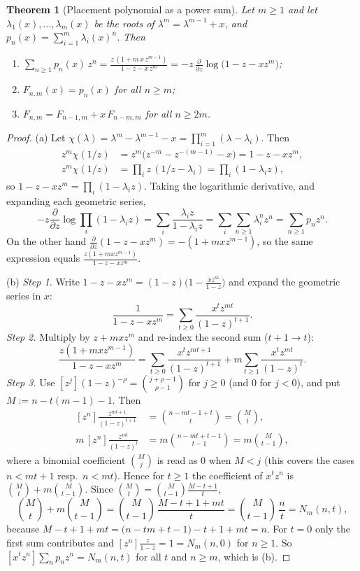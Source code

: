 \documentclass[11pt,a4paper]{article}
\newtheorem{theorem}{Theorem}[section]
\theoremstyle{definition}
\theoremstyle{remark}
\begin{document}
\begin{theorem}[Placement polynomial as a power sum]\label{thm:gf}
Let $m\ge1$ and let $\lambda_1(x),\dots,\lambda_m(x)$ be the roots of $\lambda^m=\lambda^{m-1}+x$, and $p_n(x)=\sum_{i=1}^m\lambda_i(x)^n$. Then
\begin{enumerate}[label=(\alph*),nosep]
\item $\displaystyle\sum_{n\ge1}p_n(x)\,z^n=\frac{z\,(1+m\,x\,z^{m-1})}{1-z-x\,z^m}=-z\,\frac{\partial}{\partial z}\log\big(1-z-xz^m\big)$;
\item $F_{n,m}(x)=p_n(x)$ for all $n\ge m$;
\item $F_{n,m}=F_{n-1,m}+x\,F_{n-m,m}$ for all $n\ge2m$.
\end{enumerate}
\end{theorem}
\begin{proof}
(a) Let $\chi(\lambda)=\lambda^m-\lambda^{m-1}-x=\prod_{i=1}^m(\lambda-\lambda_i)$. Then
\[
\begin{aligned}
z^m\chi(1/z)&=z^m\big(z^{-m}-z^{-(m-1)}-x\big)=1-z-xz^m,\\
z^m\chi(1/z)&=\prod_i z\,(1/z-\lambda_i)=\prod_i(1-\lambda_iz),
\end{aligned}
\]
so $1-z-xz^m=\prod_i(1-\lambda_iz)$. Taking the logarithmic derivative, and expanding each geometric series,
\[
-z\frac{\partial}{\partial z}\log\prod_i(1-\lambda_iz)=\sum_i\frac{\lambda_iz}{1-\lambda_iz}=\sum_i\sum_{n\ge1}\lambda_i^nz^n=\sum_{n\ge1}p_nz^n .
\]
On the other hand $\frac{\partial}{\partial z}(1-z-xz^m)=-(1+mxz^{m-1})$, so the same expression equals $\frac{z(1+mxz^{m-1})}{1-z-xz^m}$.

(b) \emph{Step 1.} Write $1-z-xz^m=(1-z)\big(1-\tfrac{xz^m}{1-z}\big)$ and expand the geometric series in $x$:
\[
\frac1{1-z-xz^m}=\sum_{t\ge0}\frac{x^tz^{mt}}{(1-z)^{t+1}}.
\]
\emph{Step 2.} Multiply by $z+mxz^m$ and re-index the second sum ($t+1\to t$):
\[
\frac{z(1+mxz^{m-1})}{1-z-xz^m}=\sum_{t\ge0}\frac{x^tz^{mt+1}}{(1-z)^{t+1}}+m\sum_{t\ge1}\frac{x^tz^{mt}}{(1-z)^{t}} .
\]
\emph{Step 3.} Use $[z^j](1-z)^{-\rho}=\binom{j+\rho-1}{\rho-1}$ for $j\ge0$ (and $0$ for $j<0$), and put $M:=n-t(m-1)-1$. Then
\[
\begin{aligned}
[z^n]\frac{z^{mt+1}}{(1-z)^{t+1}}&=\binom{n-mt-1+t}{t}=\binom Mt,\\
m\,[z^n]\frac{z^{mt}}{(1-z)^{t}}&=m\binom{n-mt+t-1}{t-1}=m\binom M{t-1},
\end{aligned}
\]
where a binomial coefficient $\binom Mj$ is read as $0$ when $M<j$ (this covers the cases $n<mt+1$ resp.\ $n<mt$). Hence for $t\ge1$ the coefficient of $x^tz^n$ is $\binom Mt+m\binom M{t-1}$. Since $\binom Mt=\binom M{t-1}\frac{M-t+1}t$,
\[
\binom Mt+m\binom M{t-1}=\binom M{t-1}\,\frac{M-t+1+mt}{t}=\binom M{t-1}\,\frac nt=N_m(n,t),
\]
because $M-t+1+mt=\big(n-tm+t-1\big)-t+1+mt=n$. For $t=0$ only the first sum contributes and $[z^n]\frac z{1-z}=1=N_m(n,0)$ for $n\ge1$.
So $[x^tz^n]\sum_{n}p_nz^n=N_m(n,t)$ for all $t$ and $n\ge m$, which is (b).


\end{proof}
\end{document}
